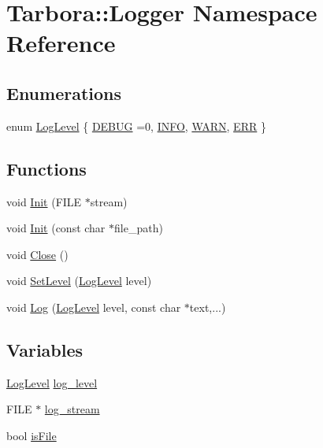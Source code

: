 \hypertarget{namespaceTarbora_1_1Logger}{}\section{Tarbora\+:\+:Logger Namespace Reference}
\label{namespaceTarbora_1_1Logger}
\subsection*{Enumerations}
\begin{DoxyCompactItemize}
\item 
enum \hyperlink{namespaceTarbora_1_1Logger_a0596faea258f2da51ad7ca3abd806be3}{Log\+Level} \{ \hyperlink{namespaceTarbora_1_1Logger_a0596faea258f2da51ad7ca3abd806be3a637838e7ac53f815345e03da3b513cd9}{D\+E\+B\+UG} =0, 
\hyperlink{namespaceTarbora_1_1Logger_a0596faea258f2da51ad7ca3abd806be3ac077d0c960e4b900f6efb02ba7285b62}{I\+N\+FO}, 
\hyperlink{namespaceTarbora_1_1Logger_a0596faea258f2da51ad7ca3abd806be3ab76e4dfaa747a78c487600b7cba04fc2}{W\+A\+RN}, 
\hyperlink{namespaceTarbora_1_1Logger_a0596faea258f2da51ad7ca3abd806be3af6ed6f0a1a83d152e8a694e219805b89}{E\+RR}
 \}
\end{DoxyCompactItemize}
\subsection*{Functions}
\begin{DoxyCompactItemize}
\item 
void \hyperlink{namespaceTarbora_1_1Logger_a55be0d3eeea01a9fbb0a26e029451411}{Init} (F\+I\+LE $\ast$stream)
\item 
void \hyperlink{namespaceTarbora_1_1Logger_af5cc4f3b068f2bde26943da40e1d6e91}{Init} (const char $\ast$file\+\_\+path)
\item 
void \hyperlink{namespaceTarbora_1_1Logger_add4c310a2ab7b0daa730e477853d6c8f}{Close} ()
\item 
void \hyperlink{namespaceTarbora_1_1Logger_af2a11244236bad59fce9cc6a1360af29}{Set\+Level} (\hyperlink{namespaceTarbora_1_1Logger_a0596faea258f2da51ad7ca3abd806be3}{Log\+Level} level)
\item 
void \hyperlink{namespaceTarbora_1_1Logger_aa32641fca455178d88f3b1c8b2f552ab}{Log} (\hyperlink{namespaceTarbora_1_1Logger_a0596faea258f2da51ad7ca3abd806be3}{Log\+Level} level, const char $\ast$text,...)
\end{DoxyCompactItemize}
\subsection*{Variables}
\begin{DoxyCompactItemize}
\item 
\hyperlink{namespaceTarbora_1_1Logger_a0596faea258f2da51ad7ca3abd806be3}{Log\+Level} \hyperlink{namespaceTarbora_1_1Logger_ab8b2a782a7df85e30b453d35c5311ba0}{log\+\_\+level}
\item 
F\+I\+LE $\ast$ \hyperlink{namespaceTarbora_1_1Logger_a1846f65cee5798455ef36a3479804446}{log\+\_\+stream}
\item 
bool \hyperlink{namespaceTarbora_1_1Logger_acff3c742b3666af3ef346d208a35db80}{is\+File}
\end{DoxyCompactItemize}


